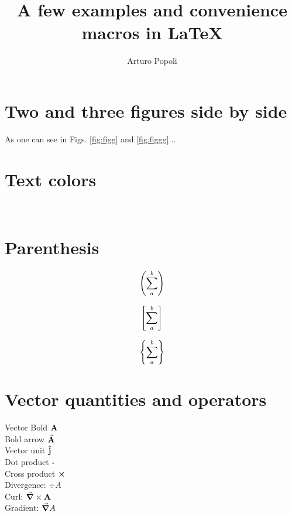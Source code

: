 \documentclass{report}
\title{A few examples and convenience macros in LaTeX}
\author{Arturo Popoli}
\begin{document}
	
	\maketitle
	

	
	\section{Two and three figures side by side}
	
	
	As one can see in Figs. \ref{fig:figg} and \ref{fig:figgg}$\ldots$
	
	\section{Text colors}
	 \\
	
	\section{Parenthesis}
	
	\begin{equation}\label{key}
		\left(\sum_{a}^{b}\right)
	\end{equation}

	\begin{equation}\label{key}
		\left[\sum_{a}^{b}\right]
	\end{equation}

	\begin{equation}\label{key}
		\left\lbrace \sum_{a}^{b}\right\rbrace
	\end{equation}
	
	\section{Vector quantities and operators}
	Vector Bold $ \vb{A} $ \\
	Bold arrow $ \va{A} $ \\
	Vector unit $ \vu{j} $ \\
	Dot product $ \boldsymbol\cdot $ \\
	Cross product $ \boldsymbol\times $ \\
    Divergence: $ \div{A} $ \\
    Curl: $ \curl{A} $ \\
    Gradient: $ \vec{\boldsymbol\nabla} A $ \\
 	
\end{document}
